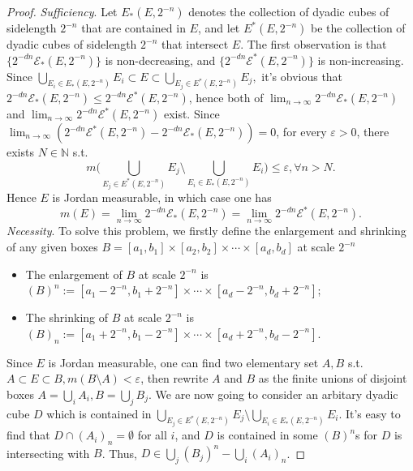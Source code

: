 \documentclass{article}
\begin{document}
\begin{ex}\end{ex}
\begin{proof}
\emph{Sufficiency}. Let $E_*(E, 2^{-n})$ denotes the collection of dyadic cubes of sidelength $2^{-n}$ that are contained 
in $E$, and let $E^*(E, 2^{-n})$ be the collection of dyadic cubes of sidelength $2^{-n}$ that intersect $E$.
The first observation is that $\{2^{-dn} \mathcal{E}_*(E, 2^{-n})\}$ is non-decreasing, and 
$\{2^{-dn} \mathcal{E}^*(E, 2^{-n})\}$ is non-increasing. Since $
\bigcup_{E_i \in E_*(E, 2^{-n})} E_i \subset E \subset \bigcup_{E_j \in E^*(E, 2^{-n})} E_j, 
$ it's obvious that $2^{-dn} \mathcal{E}_*(E, 2^{-n}) \leq 2^{-dn} \mathcal{E}^*(E, 2^{-n})$, hence both of 
$\lim_{n \to \infty} 2^{-dn} \mathcal{E}_*(E, 2^{-n})$ and $\lim_{n \to \infty} 2^{-dn} \mathcal{E}^*(E, 2^{-n})$
exist. Since $\lim_{n \to \infty} (2^{-dn} \mathcal{E}^*(E, 2^{-n}) - 2^{-dn} \mathcal{E}_*(E, 2^{-n})) = 0$, for
every $\varepsilon > 0$, there exists $N \in \mathbb{N}$ s.t. $$
m\Bigg( \bigcup_{E_j \in E^*(E, 2^{-n})} E_j \setminus \bigcup_{E_i \in E_*(E, 2^{-n})} E_i \Bigg) \leq \varepsilon,
\forall n > N.
$$
Hence $E$ is Jordan measurable, in which case one has $$
m(E) = \lim_{n \to \infty} 2^{-dn} \mathcal{E}_*(E, 2^{-n}) = \lim_{n \to \infty} 2^{-dn} \mathcal{E}^*(E, 2^{-n}).
$$
\emph{Necessity}. To solve this problem, we firstly define the enlargement and shrinking of any given boxes 
$B = [a_1, b_1] \times [a_2, b_2] \times \cdots \times [a_d, b_d]$ at scale $2^{-n}$\begin{itemize}
    \item The enlargement of $B$ at scale $2^{-n}$ is $(B)^n := [a_1 - 2^{-n}, b_1 + 2^{-n}] \times \cdots \times 
    [a_d - 2^{-n}, b_d + 2^{-n}]$;
    \item The shrinking of $B$ at scale $2^{-n}$ is $(B)_n := [a_1 + 2^{-n}, b_1 - 2^{-n}] \times \cdots \times 
    [a_d + 2^{-n}, b_d - 2^{-n}]$.
\end{itemize}
Since $E$ is Jordan measurable, one can find two elementary set $A, B$ s.t. $A \subset E \subset B, m(B \setminus A) < \varepsilon$,
then rewrite $A$ and $B$ as the finite unions of disjoint boxes $A = \bigcup_i A_i, B = \bigcup_j B_j$. We are now
going to consider an arbitary dyadic cube $D$ which is contained in $\bigcup_{E_j \in E^*(E, 2^{-n})} E_j \setminus 
\bigcup_{E_i \in E_*(E, 2^{-n})} E_i$. It's easy to find that $D \cap (A_i)_n = \emptyset$ for all $i$, and $D$ is
contained in some $(B)^n$s for $D$ is intersecting with $B$. Thus, $D \in \bigcup_j (B_j)^n - \bigcup_i (A_i)_n$.

\end{proof}
\end{document}

